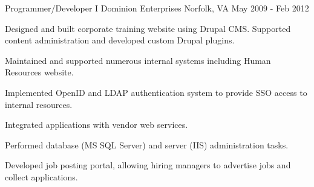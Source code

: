 \begin{cventries}
  \cventry
    {Programmer/Developer I} %
    {Dominion Enterprises} %
    {Norfolk, VA} %
    {May 2009 - Feb 2012} %
    {
      \begin{cvitems} %
        \item {Designed and built corporate training website using Drupal CMS.
        Supported content administration and developed custom Drupal plugins.}
        \item {Maintained and supported numerous internal systems including
        Human Resources website.}
        \item {Implemented OpenID and LDAP authentication system to provide SSO
        access to internal resources.}
        \item {Integrated applications with vendor web services.}
        \item {Performed database (MS SQL Server) and server (IIS)
        administration tasks.}
        \item {Developed job posting portal, allowing hiring managers to
        advertise jobs and collect applications.}
      \end{cvitems}
    }

\end{cventries}
